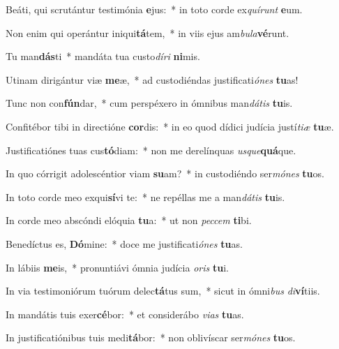 \item Beáti, qui scrutántur testimónia \textbf{e}jus:~* in toto corde ex\textit{quí}\textit{runt} \textbf{e}um.
\item Non enim qui operántur iniqui\textbf{tá}tem,~* in viis ejus am\textit{bu}\textit{la}\textbf{vé}runt.
\item Tu man\textbf{dás}ti~* mandáta tua custo\textit{dí}\textit{ri} \textbf{ni}mis.
\item Utinam dirigántur viæ \textbf{me}æ,~* ad custodiéndas justificati\textit{ó}\textit{nes} \textbf{tu}as!
\item Tunc non con\textbf{fún}dar,~* cum perspéxero in ómnibus man\textit{dá}\textit{tis} \textbf{tu}is.
\item Confitébor tibi in directióne \textbf{cor}dis:~* in eo quod dídici judícia justí\textit{ti}\textit{æ} \textbf{tu}æ.
\item Justificatiónes tuas cus\textbf{tó}diam:~* non me derelínquas \textit{us}\textit{que}\textbf{quá}que.
\item In quo córrigit adolescéntior viam \textbf{su}am?~* in custodiéndo ser\textit{mó}\textit{nes} \textbf{tu}os.
\item In toto corde meo exqui\textbf{sí}vi te:~* ne repéllas me a man\textit{dá}\textit{tis} \textbf{tu}is.
\item In corde meo abscóndi elóquia \textbf{tu}a:~* ut non \textit{pec}\textit{cem} \textbf{ti}bi.
\item Benedíctus es, \textbf{Dó}mine:~* doce me justificati\textit{ó}\textit{nes} \textbf{tu}as.
\item In lábiis \textbf{me}is,~* pronuntiávi ómnia judícia \textit{o}\textit{ris} \textbf{tu}i.
\item In via testimoniórum tuórum delec\textbf{tá}tus sum,~* sicut in ómni\textit{bus} \textit{di}\textbf{ví}tiis.
\item In mandátis tuis exer\textbf{cé}bor:~* et considerábo \textit{vi}\textit{as} \textbf{tu}as.
\item In justificatiónibus tuis medi\textbf{tá}bor:~* non oblivíscar ser\textit{mó}\textit{nes} \textbf{tu}os.
